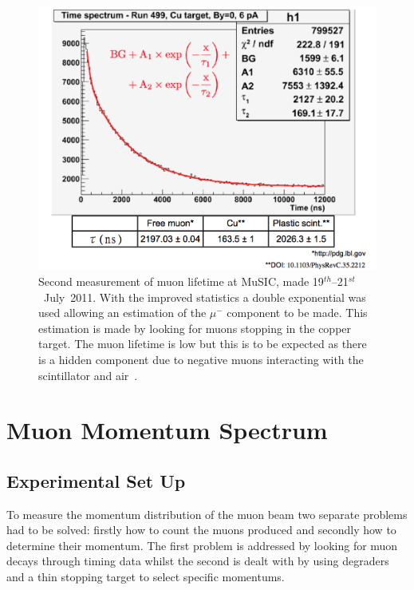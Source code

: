 \begin{figure}[hptb]
  \centering
    \includegraphics[width=.9\textwidth]{images/muon_decay.png}
  \caption{Second measurement of muon lifetime at MuSIC, made 19\( ^{th} \)--21\( ^{st} \)~July~2011. With the improved statistics a double exponential was used allowing an estimation of the \( \mu^{-} \) component to be made. This estimation is made by looking for muons stopping in the copper target. The muon lifetime is low but this is to be expected as there is a hidden component due to negative muons interacting with the scintillator and air~\cite{Muon lifetime in scintillator}.}
  \label{fig:3_measurements_images_muon_decay}
\end{figure}


\chapter{Muon Momentum Spectrum} %
\label{sec:muon_momentum_spectrum}

\section{Experimental Set Up} %
\label{sec:experimental_set_up}
To measure the momentum distribution of the muon beam two separate problems had to be solved: firstly how to count the muons produced and secondly how to determine their momentum. The first problem is addressed by looking for muon decays through timing data whilst the second is dealt with by using degraders and a thin stopping target to select specific momentums. 

